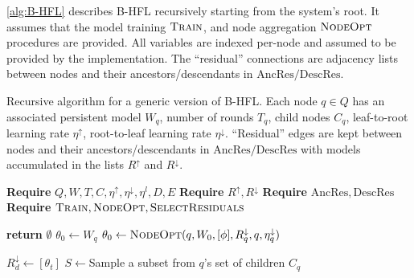 \cref{alg:B-HFL} describes B-HFL recursively starting from the system's root. It assumes that the model training $\textsc{Train}$, and node aggregation $\textsc{NodeOpt}$ procedures are provided. All variables are indexed per-node and assumed to be provided by the implementation. The ``residual'' connections are adjacency lists between nodes and their ancestors/descendants in $\mathrm{AncRes}/\mathrm{DescRes}$.

\begin{algorithm}[H]
    \caption[Bidirectional Hierarchical FL]{Recursive algorithm for a generic version of B-HFL. Each node $q \in Q$ has an associated persistent model $W_q$, number of rounds $T_q$, child nodes $C_q$, leaf-to-root learning rate $\eta^\uparrow$, root-to-leaf learning rate $\eta^\downarrow$. ``Residual'' edges are kept between nodes and their ancestors/descendants in $\mathrm{AncRes}/\mathrm{DescRes}$
        with models accumulated in the lists $R^\uparrow$ and $R^\downarrow$. }\label{alg:B-HFL}
    \begin{onehalfspace}

        \begin{algorithmic}[1]
            \State \textbf{Require} \(Q, W, T, C, \eta^\uparrow, \eta^\downarrow, \eta^l,D,E\) \label{alg:B-HFL:line:r0}
            \State \textbf{Require}  $R^{\uparrow},R^{\downarrow}$  \label{alg:B-HFL:line:r1}
            \State \textbf{Require}  $\mathrm{AncRes},\mathrm{DescRes} $  \label{alg:B-HFL:line:r2}
            \State \textbf{Require}  \(\textsc{Train} ,\textsc{NodeOpt}, \textsc{SelectResiduals}  \) \label{alg:B-HFL:line:r3}

              \label{alg:B-HFL:line:1}
            \textbf{return} $\emptyset$  \label{alg:B-HFL:line:2}
            \EndIf
            \State $\theta_0 \gets W_q$   \label{alg:B-HFL:line:3}
            \If{$\phi \neq \emptyset$} \label{alg:B-HFL:line:4}
            \State $\theta_0 \gets \Call{NodeOpt}{q,W_0,[\phi], R^\downarrow_q, q, \eta^\downarrow_q} $  \label{alg:B-HFL:line:5}
            \EndIf



             \label{alg:B-HFL:line:6}
              \label{alg:B-HFL:line:8}
            \State $ R^\downarrow_d \gets [\theta_t]$ \label{alg:B-HFL:line:9}
            \EndFor
            \State $S \gets $Sample a subset from $q$'s set of children $C_q$ \label{alg:B-HFL:line:10}



\end{algorithmic}
\end{onehalfspace}
\end{algorithm}
